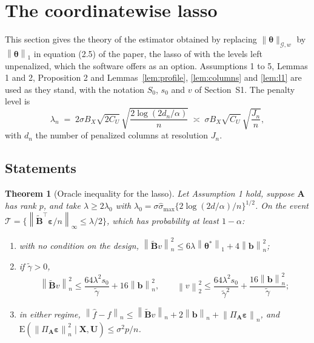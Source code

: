 \documentclass[10pt]{book}
\newtheorem{theorem}{Theorem}[section]
\theoremstyle{definition}
\newcommand{\E}{\mathrm{E}}
\newcommand{\T}{^{\top}}
\newcommand{\norm}[1]{\left\lVert #1 \right\rVert}
\newcommand{\normn}[1]{\left\lVert #1 \right\rVert_{n}}
\newcommand{\bX}{\mathbf{X}}
\newcommand{\bU}{\mathbf{U}}
\newcommand{\btheta}{\boldsymbol{\theta}}
\newcommand{\thetastar}{\btheta^{*}}
\newcommand{\pen}{\lambda}
\newcommand{\penn}{\lambda_{n}}
\newcommand{\Szero}{S_{0}}
\newcommand{\Amat}{\mathbf{A}}
\newcommand{\Bmat}{\mathbf{B}}
\newcommand{\Btil}{\widetilde{\Bmat}}
\newcommand{\PA}{\Pi_{\Amat}}
\newcommand{\bveps}{\boldsymbol{\varepsilon}}
\newcommand{\bb}{\mathbf{b}}
\newcommand{\smax}{\widehat{\sigma}_{\max}}
\newcommand{\gtil}{\widetilde{\gamma}}
\newcommand{\nGw}[1]{\lVert #1\rVert_{\mathcal{G},w}}
\begin{document}
{\color{colR1}
\section{The coordinatewise lasso}
\setcounter{equation}{0}

\noindent[k = 4: the statements of this section stood in Sections 3.2 to 3.6 of
the paper, and their proofs in Sections S5 to S7 of this supplement.]

This section gives the theory of the estimator obtained by replacing
$\nGw{\btheta}$ by $\norm{\btheta}_{1}$ in equation (2.5) of the paper, the
lasso of \citet{tibshirani1996regression} with the levels left unpenalized,
which the software offers as an option. Assumptions 1 to 5, Lemmas 1 and 2,
Proposition 2 and Lemmas~\ref{lem:profile}, \ref{lem:columns} and \ref{lem:l1}
are used as they stand, with the notation $\Szero$, $s_0$ and $v$ of
Section~S1. The penalty level is
\begin{equation}
  \label{eq:lasso-lambda}
  \penn \;=\; 2\sigma B_X\sqrt{2C_U}\,
  \sqrt{\frac{2\log(2d_n/\alpha)}{n}} \;\asymp\;
  \sigma B_X \sqrt{C_U}\,\sqrt{\frac{J_n}{n}} ,
\end{equation}
with $d_n$ the number of penalized columns at resolution $J_n$.

\subsection*{Statements}

\begin{theorem}[Oracle inequality for the lasso]
\label{thm:lasso-oracle}
Let Assumption 1 hold, suppose $\Amat$ has rank $p$, and take
$\pen \ge 2\pen_0$ with
$\pen_0 = \sigma\smax\{2\log(2d/\alpha)/n\}^{1/2}$. On the event
$\mathcal{T} = \{\norm{\Btil\T\bveps/n}_{\infty} \le \pen/2\}$, which has
probability at least $1 - \alpha$:
\begin{enumerate}
\item[(i)] with no condition on the design,
$\normn{\Btil v}^{2} \le 6\pen\norm{\thetastar}_{1} + 4\normn{\bb}^{2}$;
\item[(ii)] if $\gtil > 0$,
\[
  \normn{\Btil v}^{2} \le \frac{64\pen^{2}s_0}{\gtil} + 16\normn{\bb}^{2},
  \qquad
  \norm{v}_{2}^{2} \le \frac{64\pen^{2}s_0}{\gtil^{2}}
  + \frac{16\normn{\bb}^{2}}{\gtil} ;
\]
\item[(iii)] in either regime,
$\normn{\widehat{f}-f} \le \normn{\Btil v} + 2\normn{\bb}
+ \normn{\PA\bveps}$, and
$\E(\normn{\PA\bveps}^{2}\mid\bX,\bU) \le \sigma^{2}p/n$.
\end{enumerate}
\end{theorem}

}
\end{document}
